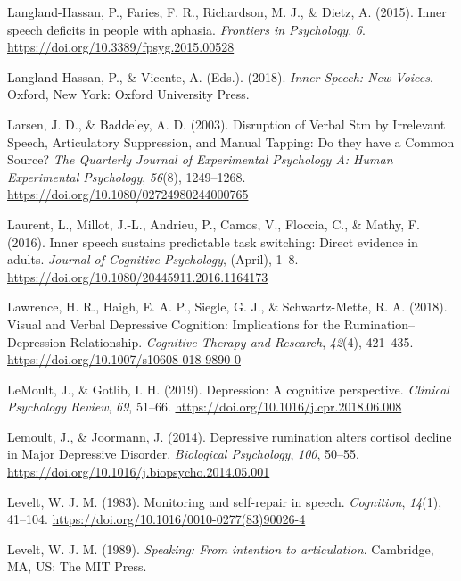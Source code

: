 \documentclass[a4paper,12pt,twoside,onecolumn,openright,final,oldfontcommands]{memoir}
\begin{document}
\leavevmode\hypertarget{ref-langland-hassan_inner_2015}{}%
Langland-Hassan, P., Faries, F. R., Richardson, M. J., \& Dietz, A. (2015). Inner speech deficits in people with aphasia. \emph{Frontiers in Psychology}, \emph{6}. \url{https://doi.org/10.3389/fpsyg.2015.00528}

\leavevmode\hypertarget{ref-langland-hassan_inner_2018}{}%
Langland-Hassan, P., \& Vicente, A. (Eds.). (2018). \emph{Inner Speech: New Voices}. Oxford, New York: Oxford University Press.

\leavevmode\hypertarget{ref-larsen_disruption_2003}{}%
Larsen, J. D., \& Baddeley, A. D. (2003). Disruption of Verbal Stm by Irrelevant Speech, Articulatory Suppression, and Manual Tapping: Do they have a Common Source? \emph{The Quarterly Journal of Experimental Psychology A: Human Experimental Psychology}, \emph{56}(8), 1249--1268. \url{https://doi.org/10.1080/02724980244000765}

\leavevmode\hypertarget{ref-Laurent2016}{}%
Laurent, L., Millot, J.-L., Andrieu, P., Camos, V., Floccia, C., \& Mathy, F. (2016). Inner speech sustains predictable task switching: Direct evidence in adults. \emph{Journal of Cognitive Psychology}, (April), 1--8. \url{https://doi.org/10.1080/20445911.2016.1164173}

\leavevmode\hypertarget{ref-lawrence_visual_2018}{}%
Lawrence, H. R., Haigh, E. A. P., Siegle, G. J., \& Schwartz-Mette, R. A. (2018). Visual and Verbal Depressive Cognition: Implications for the Rumination--Depression Relationship. \emph{Cognitive Therapy and Research}, \emph{42}(4), 421--435. \url{https://doi.org/10.1007/s10608-018-9890-0}

\leavevmode\hypertarget{ref-lemoult_depression_2019}{}%
LeMoult, J., \& Gotlib, I. H. (2019). Depression: A cognitive perspective. \emph{Clinical Psychology Review}, \emph{69}, 51--66. \url{https://doi.org/10.1016/j.cpr.2018.06.008}

\leavevmode\hypertarget{ref-Lemoult2014}{}%
Lemoult, J., \& Joormann, J. (2014). Depressive rumination alters cortisol decline in Major Depressive Disorder. \emph{Biological Psychology}, \emph{100}, 50--55. \url{https://doi.org/10.1016/j.biopsycho.2014.05.001}

\leavevmode\hypertarget{ref-levelt_monitoring_1983}{}%
Levelt, W. J. M. (1983). Monitoring and self-repair in speech. \emph{Cognition}, \emph{14}(1), 41--104. \url{https://doi.org/10.1016/0010-0277(83)90026-4}

\leavevmode\hypertarget{ref-levelt_speaking_1989}{}%
Levelt, W. J. M. (1989). \emph{Speaking: From intention to articulation}. Cambridge, MA, US: The MIT Press.
\end{document}
